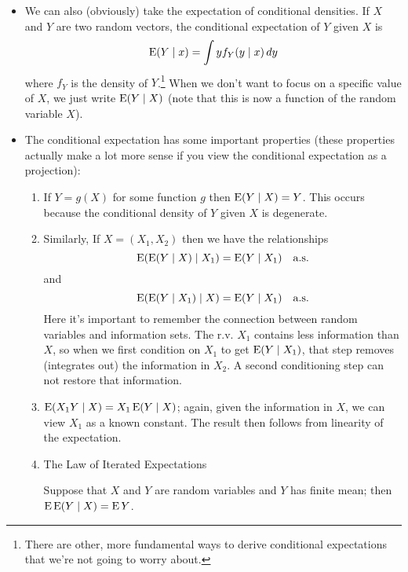 \begin{itemize}[leftmargin=0pt]

\item We can also (obviously) take the expectation of conditional
  densities.  If $X$ and $Y$ are two random vectors, the conditional
  expectation of $Y$ given $X$ is
  \begin{equation*}
    \operatorname{E}(Y \mid x) = \int y f_Y(y \mid x) \,dy
  \end{equation*}
  where $f_Y$ is the density of $Y$.\footnote{There are other, more
  fundamental ways to derive conditional expectations that we're not
  going to worry about.}  When we don't want to focus on a specific
  value of $X$, we just write $\operatorname{E}(Y \mid X)$ (note that this is now a
  function of the random variable $X$).

\item The conditional expectation has some important properties (these
  properties actually make a lot more sense if you view the
  conditional expectation as a projection):
  \begin{enumerate}
  \item If $Y = g(X)$ for some function $g$ then $\operatorname{E}(Y \mid X) = Y$.
    This occurs because the conditional density of $Y$ given $X$ is
    degenerate.
  \item Similarly, If $X = (X_1, X_2)$ then we have the relationships
    \begin{equation*}
      \operatorname{E}(\operatorname{E}(Y \mid X) \mid X_1) = \operatorname{E}(Y \mid X_1) \quad\text{a.s.}
    \end{equation*}
    and
    \begin{equation*}
      \operatorname{E}(\operatorname{E}(Y \mid X_1) \mid X) = \operatorname{E}(Y \mid X_1) \quad\text{a.s.}
    \end{equation*}
    Here it's important to remember the connection between random
    variables and information sets.  The r.v. $X_1$ contains less
    information than $X$, so when we first condition on $X_1$ to get
    $\operatorname{E}(Y \mid X_1)$, that step removes (integrates out) the information
    in $X_2$.  A second conditioning step can not restore that
    information.
  \item $\operatorname{E}(X_1 Y \mid X) = X_1 \operatorname{E}(Y \mid X)$; again, given the information in
    $X$, we can view $X_1$ as a known constant.  The result then
    follows from linearity of the expectation.
  \item The Law of Iterated Expectations
    \begin{thm}
      Suppose that $X$ and $Y$ are random variables and $Y$ has finite
      mean; then $\operatorname{E} \operatorname{E}(Y \mid X) = \operatorname{E} Y$.

\end{thm}
\end{enumerate}
\end{itemize}
